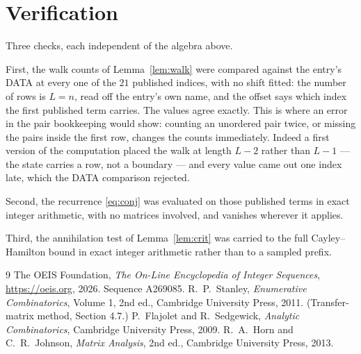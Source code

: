 \documentclass[11pt,a4paper]{article}
\theoremstyle{plain}
\theoremstyle{definition}
\begin{document}
\section{Verification}

Three checks, each independent of the algebra above.

First, the walk counts of Lemma~\ref{lem:walk} were compared against the entry's DATA at
every one of the $21$ published indices, with no shift fitted: the number of rows is
$L=n$, read off the entry's own name, and the offset says which index the first
published term carries. The values agree exactly. This is where an error in the pair
bookkeeping would show: counting an unordered pair twice, or missing the pairs inside the
first row, changes the counts immediately. Indeed a first version of the computation
placed the walk at length $L-2$ rather than $L-1$ --- the state carries a row, not a
boundary --- and every value came out one index late, which the DATA comparison rejected.

Second, the recurrence \eqref{eq:conj} was evaluated on those published terms in exact
integer arithmetic, with no matrices involved, and vanishes wherever it applies.

Third, the annihilation test of Lemma~\ref{lem:crit} was carried to the full
Cayley--Hamilton bound in exact integer arithmetic rather than to a sampled prefix.

\begin{thebibliography}{9}
 The OEIS Foundation, \emph{The On-Line Encyclopedia of Integer
Sequences}, \url{https://oeis.org}, 2026. Sequence A269085.
 R.~P.~Stanley, \emph{Enumerative Combinatorics}, Volume 1, 2nd ed.,
Cambridge University Press, 2011. (Transfer-matrix method, Section 4.7.)
 P.~Flajolet and R.~Sedgewick, \emph{Analytic Combinatorics}, Cambridge
University Press, 2009.
 R.~A.~Horn and C.~R.~Johnson, \emph{Matrix Analysis}, 2nd ed., Cambridge
University Press, 2013.
\end{thebibliography}
\end{document}
